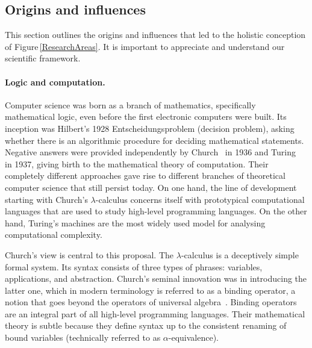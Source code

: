 \documentclass[11pt,twocolumn]{article}
\newcommand{\hide}[1]{}
\newcommand{\pref}[1]{\,(\ref{#1})}
\newcommand{\lcalculus}{\mbox{$\lambda$-calculus}}
\begin{document}
\subsection{Origins and influences}
\label{Origins}

This section outlines the origins and influences that led to the holistic
conception of Figure\,\ref{ResearchAreas}. 
It is important to appreciate and understand our scientific framework.

\paragraph{Logic and computation.}

Computer science was born as a branch of mathematics, specifically
mathematical logic, even before the first electronic computers were built.
Its inception %
was Hilbert's %
1928 Entscheidungsproblem (decision problem),
asking whether there is an algorithmic procedure for deciding mathematical
statements.  Negative answers were provided independently by
Church~\cite{Church1936} in 1936 and Turing~\cite{Turing} in 1937,
giving birth to the mathematical theory of computation.  Their completely
different approaches gave rise to different branches of theoretical
computer science that still persist today.  
On one hand, the line
of development starting with Church's {\lcalculus} %
concerns itself with prototypical computational languages that are
used to study high-level programming languages.  
On the other hand, Turing's machines %
are the most widely 
used model for analysing computational complexity.

Church's view is central to this proposal.  The {\lcalculus} is a
deceptively simple formal system.  Its syntax consists of three types of
phrases: variables, applications, and abstraction.  Church's seminal
innovation was in introducing the latter one, 
which in modern terminology is referred to as a binding operator, a notion
that goes beyond the operators of universal algebra~\cite{Birkhoff}.
Binding operators are an integral part of all high-level  programming
languages.  Their mathematical theory is subtle %
because they define syntax up to the consistent renaming of bound
variables (technically referred to as \mbox{$\alpha$-equivalence}).
\hide{
This subtlety is made evident by the anecdotal fact that the first definitions
of substitution were formally flawed.}
\end{document}
